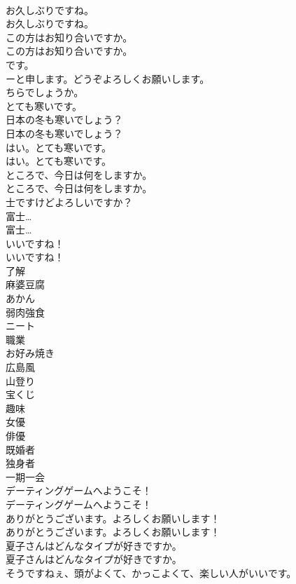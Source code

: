 \documentclass[8pt]{extreport}
\begin{document}
\begin{CJK}{UTF8}{min}
\\	お久しぶりですね。	
\\	お久しぶりですね。 
\\	この方はお知り合いですか。	
\\	この方はお知り合いですか。 
\\	です。	
\\	ーと申します。どうぞよろしくお願いします。	
\\	ちらでしょうか。	
\\	とても寒いです。	
\\	日本の冬も寒いでしょう？	
\\	日本の冬も寒いでしょう？ 
\\	はい。とても寒いです。	
\\	はい。とても寒いです。 
\\	ところで、今日は何をしますか。	
\\	ところで、今日は何をしますか。 
\\	士ですけどよろしいですか？	
\\	富士…	
\\	富士… 
\\	いいですね！	
\\	いいですね！ 
\\	了解
\\	麻婆豆腐
\\	あかん
\\	弱肉強食
\\	ニート
\\	職業
\\	お好み焼き
\\	広島風
\\	山登り
\\	宝くじ
\\	趣味
\\	女優
\\	俳優
\\	既婚者
\\	独身者
\\	一期一会
\\	デーティングゲームへようこそ！	
\\	デーティングゲームへようこそ！ 
\\	ありがとうございます。よろしくお願いします！	
\\	ありがとうございます。よろしくお願いします！ 
\\	夏子さんはどんなタイプが好きですか。	
\\	夏子さんはどんなタイプが好きですか。 
\\	そうですねぇ、頭がよくて、かっこよくて、楽しい人がいいです。	

\end{CJK}
\end{document}
